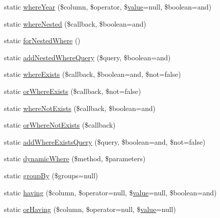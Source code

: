 \begin{DoxyCompactItemize}
\item 
static \mbox{\hyperlink{class_eloquent_a02fd683aa7d0c0159379f8d3b27d5230}{where\+Year}} (\$column, \$operator, \$\mbox{\hyperlink{class_eloquent_a653061eb837042f61e82447886e15a72}{value}}=null, \$boolean=\textquotesingle{}and\textquotesingle{})
\item 
static \mbox{\hyperlink{class_eloquent_a1e91f1cb7ebaef1a1dac7aef95a95916}{where\+Nested}} (\$callback, \$boolean=\textquotesingle{}and\textquotesingle{})
\item 
static \mbox{\hyperlink{class_eloquent_a73ee05439dd72e88926cd48a01b2ba6b}{for\+Nested\+Where}} ()
\item 
static \mbox{\hyperlink{class_eloquent_aa2f16128ef6e7142fc3a0fcf2c4590a0}{add\+Nested\+Where\+Query}} (\$query, \$boolean=\textquotesingle{}and\textquotesingle{})
\item 
static \mbox{\hyperlink{class_eloquent_abe35963f00cb4cbba9c09bf9c7a36881}{where\+Exists}} (\$callback, \$boolean=\textquotesingle{}and\textquotesingle{}, \$not=false)
\item 
static \mbox{\hyperlink{class_eloquent_a461302857867cda6902c6fcaa9581d67}{or\+Where\+Exists}} (\$callback, \$not=false)
\item 
static \mbox{\hyperlink{class_eloquent_aa2b4f08f03816e520e6f55d21ca49c06}{where\+Not\+Exists}} (\$callback, \$boolean=\textquotesingle{}and\textquotesingle{})
\item 
static \mbox{\hyperlink{class_eloquent_a0b8b11378bd5bdfcc39a9879a54adacf}{or\+Where\+Not\+Exists}} (\$callback)
\item 
static \mbox{\hyperlink{class_eloquent_aa890d018e0ad839b0bb5a2c2d243243c}{add\+Where\+Exists\+Query}} (\$query, \$boolean=\textquotesingle{}and\textquotesingle{}, \$not=false)
\item 
static \mbox{\hyperlink{class_eloquent_a92ee7d621c7c646a0e2da14be557ec53}{dynamic\+Where}} (\$method, \$parameters)
\item 
static \mbox{\hyperlink{class_eloquent_aeebb6f260f6d6fd5afab7b02ff15248a}{group\+By}} (\$groups=null)
\item 
static \mbox{\hyperlink{class_eloquent_a1a90ee18a28cc2930fbf1ba43e7a8736}{having}} (\$column, \$operator=null, \$\mbox{\hyperlink{class_eloquent_a653061eb837042f61e82447886e15a72}{value}}=null, \$boolean=\textquotesingle{}and\textquotesingle{})
\item 
static \mbox{\hyperlink{class_eloquent_a5dec38cf2c59fd1fd2f1aeba5508e0cc}{or\+Having}} (\$column, \$operator=null, \$\mbox{\hyperlink{class_eloquent_a653061eb837042f61e82447886e15a72}{value}}=null)

\end{DoxyCompactItemize}

